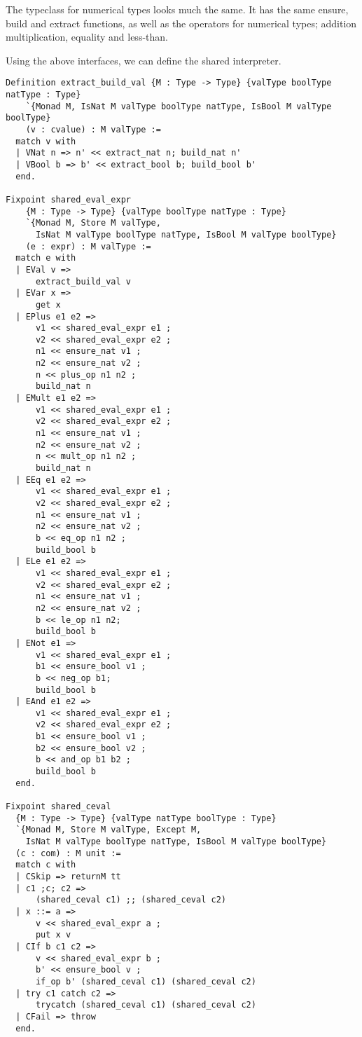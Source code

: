 The typeclass for numerical types looks much the same. It has the same ensure,
build and extract functions, as well as the operators for numerical types;
addition multiplication, equality and less-than.

Using the above interfaces, we can define the shared interpreter.
\begin{verbatim}
Definition extract_build_val {M : Type -> Type} {valType boolType natType : Type}
    `{Monad M, IsNat M valType boolType natType, IsBool M valType boolType}
    (v : cvalue) : M valType :=
  match v with
  | VNat n => n' << extract_nat n; build_nat n'
  | VBool b => b' << extract_bool b; build_bool b'
  end.

Fixpoint shared_eval_expr 
    {M : Type -> Type} {valType boolType natType : Type}
    `{Monad M, Store M valType,
      IsNat M valType boolType natType, IsBool M valType boolType}
    (e : expr) : M valType :=
  match e with
  | EVal v =>
      extract_build_val v
  | EVar x =>
      get x
  | EPlus e1 e2 => 
      v1 << shared_eval_expr e1 ;
      v2 << shared_eval_expr e2 ;
      n1 << ensure_nat v1 ;
      n2 << ensure_nat v2 ;
      n << plus_op n1 n2 ;
      build_nat n
  | EMult e1 e2 => 
      v1 << shared_eval_expr e1 ;
      v2 << shared_eval_expr e2 ;
      n1 << ensure_nat v1 ;
      n2 << ensure_nat v2 ;
      n << mult_op n1 n2 ;
      build_nat n
  | EEq e1 e2 =>
      v1 << shared_eval_expr e1 ;
      v2 << shared_eval_expr e2 ;
      n1 << ensure_nat v1 ;
      n2 << ensure_nat v2 ;
      b << eq_op n1 n2 ;
      build_bool b
  | ELe e1 e2 =>
      v1 << shared_eval_expr e1 ;
      v2 << shared_eval_expr e2 ;
      n1 << ensure_nat v1 ;
      n2 << ensure_nat v2 ;
      b << le_op n1 n2;
      build_bool b
  | ENot e1 =>
      v1 << shared_eval_expr e1 ;
      b1 << ensure_bool v1 ;
      b << neg_op b1;
      build_bool b
  | EAnd e1 e2 =>
      v1 << shared_eval_expr e1 ;
      v2 << shared_eval_expr e2 ;
      b1 << ensure_bool v1 ;
      b2 << ensure_bool v2 ;
      b << and_op b1 b2 ;
      build_bool b
  end.

Fixpoint shared_ceval 
  {M : Type -> Type} {valType natType boolType : Type}
  `{Monad M, Store M valType, Except M, 
    IsNat M valType boolType natType, IsBool M valType boolType}
  (c : com) : M unit :=
  match c with
  | CSkip => returnM tt
  | c1 ;c; c2 =>
      (shared_ceval c1) ;; (shared_ceval c2)
  | x ::= a => 
      v << shared_eval_expr a ;
      put x v
  | CIf b c1 c2 => 
      v << shared_eval_expr b ;
      b' << ensure_bool v ;
      if_op b' (shared_ceval c1) (shared_ceval c2)
  | try c1 catch c2 => 
      trycatch (shared_ceval c1) (shared_ceval c2)
  | CFail => throw
  end.
\end{verbatim}

